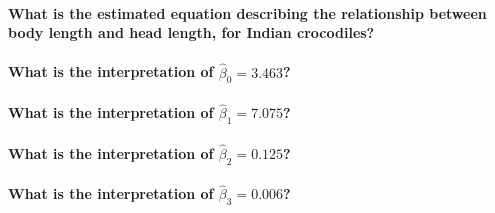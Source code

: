 \documentclass[14pt]{extarticle}
\let\oldparagraph\paragraph
\renewcommand{\paragraph}[1]{\oldparagraph{#1}\mbox{}}
\begin{document}
\vspace{3cm}

\paragraph{What is the estimated equation describing the relationship
between body length and head length, for Indian
crocodiles?}\label{what-is-the-estimated-equation-describing-the-relationship-between-body-length-and-head-length-for-indian-crocodiles-1}

\vspace{3cm}

\paragraph{\texorpdfstring{What is the interpretation of
\(\widehat{\beta}_0 = 3.463\)?}{What is the interpretation of \textbackslash{}widehat\{\textbackslash{}beta\}\_0 = 3.463?}}\label{what-is-the-interpretation-of-widehatbeta_0-3.463}

\vspace{3cm}

\paragraph{\texorpdfstring{What is the interpretation of
\(\widehat{\beta}_1 = 7.075\)?}{What is the interpretation of \textbackslash{}widehat\{\textbackslash{}beta\}\_1 = 7.075?}}\label{what-is-the-interpretation-of-widehatbeta_1-7.075}

\vspace{3cm}

\paragraph{\texorpdfstring{What is the interpretation of
\(\widehat{\beta}_2 = 0.125\)?}{What is the interpretation of \textbackslash{}widehat\{\textbackslash{}beta\}\_2 = 0.125?}}\label{what-is-the-interpretation-of-widehatbeta_2-0.125}

\vspace{3cm}

\paragraph{\texorpdfstring{What is the interpretation of
\(\widehat{\beta}_3 = 0.006\)?}{What is the interpretation of \textbackslash{}widehat\{\textbackslash{}beta\}\_3 = 0.006?}}\label{what-is-the-interpretation-of-widehatbeta_3-0.006}
\end{document}
